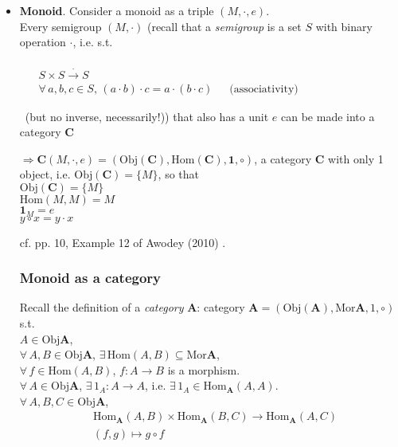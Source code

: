 \documentclass[10pt]{amsart}
\begin{document}
\begin{multicols*}{2}
\begin{itemize}
	Going in the other direction, a category with at most 1 arrow between 2 objects determines a preorder.
	\item \textbf{Monoid}.  Consider a monoid as a triple $(M, \cdot, e)$.  \\
	Every semigroup $(M,\cdot)$ (recall that a \emph{semigroup} is a set $S$ with binary operation $\cdot $, i.e. s.t.
	
	\quad \,  $\begin{aligned} & \quad \\
	& S\times S \xrightarrow{\cdot } S \\ 
	& \forall \, a,b ,c \in S, \, (a\cdot b)\cdot c = a\cdot (b\cdot c) \quad \, \text{ (associativity) } \end{aligned}$ 
	
	\quad \, (but no inverse, necessarily!)) that also has a unit $e$ can be made into a category $\mathbf{C}$ 
	
	$\Longrightarrow \mathbf{C}(M,\cdot ,e) = (\text{Obj}(\mathbf{C}), \text{Hom}(\mathbf{C}), \mathbf{1}, \circ)$, a category $\mathbf{C}$ with only 1 object, i.e. $\text{Obj}(\mathbf{C}) = \lbrace M \rbrace$, so that \\
	$\text{Obj}(\mathbf{C}) = \lbrace M \rbrace$ \\
	$\text{Hom}(M,M) = M$ \\
	$\mathbf{1}_M = e$ \\
	$y \circ x = y \cdot x$
	
	cf. pp. 10, Example 12 of Awodey (2010) \cite{Awod2010}.

\subsubsection{Monoid as a category}

Recall the definition of a \emph{category} $\mathbf{A}$: category $\mathbf{A} = (\text{Obj}(\mathbf{A}), \text{Mor}{\mathbf{A}}, 1, \circ)$ s.t.\\
$A \in \text{Obj}\mathbf{A}$, \\
$\forall \, A, B \in \text{Obj}\mathbf{A}$, $\exists \, \text{Hom}(A,B) \subseteq \text{Mor}\mathbf{A}$, \\
$\forall \, f \in \text{Hom}(A,B)$, $f:A \to B$ is a morphism.\\
$\forall \, A \in \text{Obj}\mathbf{A}$, $\exists \, 1_A : A \to A$, i.e. $\exists \, 1_A \in \text{Hom}_{\mathbf{A}}(A,A)$. \\
$\forall \, A, B, C \in \text{Obj}\mathbf{A}$,  \\
\[
\begin{aligned} 
	& \text{Hom}_{\mathbf{A}}(A, B) \times \text{Hom}_{\mathbf{A}}(B,C) \to \text{Hom}_{\mathbf{A}}(A, C) \\ 
	& (f,g) \mapsto g\circ f \end{aligned} \] \\


\end{itemize}
\end{multicols*}
\end{document}

